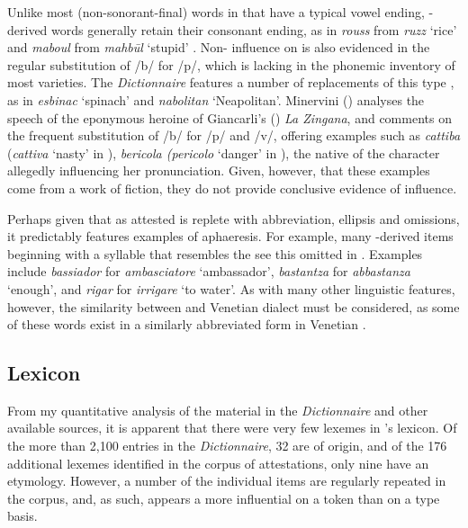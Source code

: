 \documentclass[output=paper]{langsci/langscibook}
\begin{document}
	Unlike most (non-sonorant-final) words in  that have a typical  vowel ending, -derived words generally retain their consonant ending, as in \textit{rouss} from \textit{ruzz} ‘rice’ and \textit{maboul} from \textit{mahbūl} ‘stupid’ \citep[38]{Cifoletti2004}. Non- influence on  is also evidenced in the regular substitution of /b/ for /p/, which is lacking in the phonemic inventory of most  varieties. The \textit{Dictionnaire} features a number of replacements of this type \citep[38]{Cifoletti2004}, as in \textit{esbinac} ‘spinach’ and \textit{nabolitan} ‘Neapolitan’.  Minervini (\citeyear[257–60]{Minervini1996}) analyses the speech of the eponymous heroine of Giancarli’s (\citeyear{Giancarli1545}) \textit{La Zingana}, and comments on the frequent substitution of /b/ for /p/ and /v/, offering examples such as \textit{cattiba} (\textit{cattiva} ‘nasty’ in ), \textit{bericola (pericolo} ‘danger’ in ), the native  of the character allegedly influencing her pronunciation. Given, however, that these examples come from a work of fiction, they do not provide conclusive evidence of influence. 
	
	Perhaps given that  as attested is replete with abbreviation, ellipsis and omissions, it predictably features examples of aphaeresis. For example, many -derived items beginning with a syllable that resembles the    see this omitted in . Examples include \textit{bassiador} for \textit{ambasciatore} ‘ambassador’, \textit{bastantza} for \textit{abbastanza} ‘enough’, and \textit{rigar} for \textit{irrigare} ‘to water’. As with many other linguistic features, however, the similarity between  and Venetian dialect must be considered, as some of these words exist in a similarly abbreviated form in Venetian \citep{Schuchardt1909}.
	
\subsection{Lexicon}
	
	From my quantitative analysis of the material in the \textit{Dictionnaire} and other available sources, it is apparent that there were very few  lexemes in ’s lexicon. Of the more than 2,100 entries in the \textit{Dictionnaire}, 32 are of  origin, and of the 176 additional  lexemes identified in the corpus of attestations, only nine have an  etymology. However, a number of the individual items are regularly repeated in the corpus, and, as such,  appears a more influential  on a token than on a type basis.
	
\end{document}
